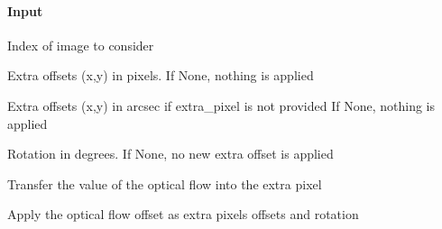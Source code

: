 \documentclass[letterpaper,10pt,english]{sphinxmanual}
\begin{document}
\begin{fulllineitems}
\begin{fulllineitems}
\paragraph{Input}
\label{\detokenize{api/pymusepipe:input}}\begin{description}
\sphinxAtStartPar
Index of image to consider

\sphinxAtStartPar
Extra offsets (x,y) in pixels. If None, nothing is applied

\sphinxAtStartPar
Extra offsets (x,y) in arcsec if extra\_pixel is not provided
If None, nothing is applied

\sphinxAtStartPar
Rotation in degrees. If None, no new extra offset is applied

\end{description}

\end{fulllineitems}


\begin{fulllineitems}
\label{\detokenize{api/pymusepipe:pymusepipe.align_pipe.AlignMuseDataset.apply_optical_flow_offset_ima}}
\pysigstartsignatures
{}
\pysigstopsignatures
\sphinxAtStartPar
Transfer the value of the optical flow into the extra pixel

\end{fulllineitems}


\begin{fulllineitems}
\label{\detokenize{api/pymusepipe:pymusepipe.align_pipe.AlignMuseDataset.apply_optical_flow_offset_listima}}
\pysigstartsignatures
{}
\pysigstopsignatures
\sphinxAtStartPar
Apply the optical flow offset as extra pixels offsets and rotation



\end{fulllineitems}
\end{fulllineitems}
\end{document}
